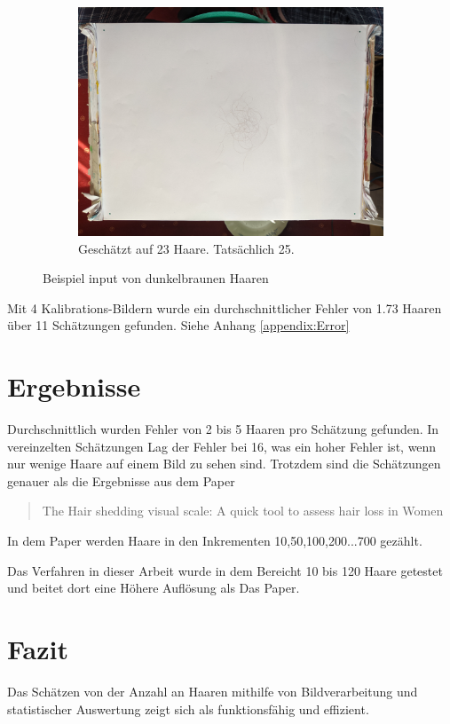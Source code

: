 \documentclass[german,a4paper, 12pt]{llncs}
\begin{document}
\begin{figure}
\begin{subfigure}[b]{0.475\textwidth}
	\end{subfigure}
	\hfill
	\begin{subfigure}[b]{0.475\textwidth} 
		\centering
		\includegraphics[width=\textwidth]{figMama/IMG_20200330_143938_25.jpg}
		\caption[]{Geschätzt auf 23 Haare. Tatsächlich 25.}
	\end{subfigure}
	\caption[  ]
	{\small Beispiel input von dunkelbraunen Haaren} 
	\label{img:tstMama}
\end{figure}

Mit 4 Kalibrations-Bildern wurde ein durchschnittlicher Fehler von 1.73 Haaren über 11 Schätzungen gefunden.
Siehe Anhang \ref{appendix:Error}

\section{Ergebnisse}

Durchschnittlich wurden Fehler von 2 bis 5 Haaren pro Schätzung gefunden. In vereinzelten Schätzungen Lag der Fehler bei 16, was ein hoher Fehler ist, wenn nur wenige Haare auf einem Bild zu sehen sind. 
Trotzdem sind die Schätzungen genauer als die Ergebnisse aus dem Paper \blockquote{The Hair shedding visual scale: A quick tool to assess hair loss in Women}. In dem Paper werden Haare in den Inkrementen 10,50,100,200...700 gezählt. \cite{visualScale}

Das Verfahren in dieser Arbeit wurde in dem Bereicht 10 bis 120 Haare getestet und beitet dort eine Höhere Auflösung als Das Paper.\cite{visualScale}

\section{Fazit}
Das Schätzen von der Anzahl an Haaren mithilfe von Bildverarbeitung und statistischer Auswertung zeigt sich als funktionsfähig und effizient. 
\end{document}
